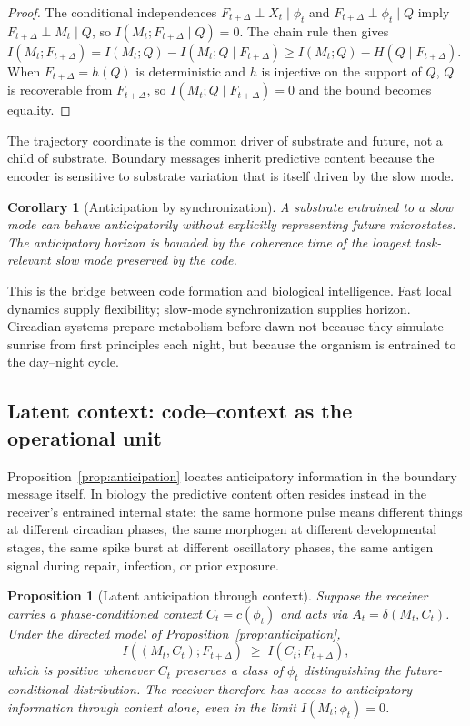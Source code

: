 \documentclass[12pt]{article}
\newtheorem{proposition}{Proposition}
\newtheorem{corollary}{Corollary}
\theoremstyle{definition}
\newcommand{\I}{I}
\begin{document}
\begin{proof}
The conditional independences $F_{t+\Delta}\perp X_t\mid\phi_t$ and $F_{t+\Delta}\perp\phi_t\mid Q$ imply $F_{t+\Delta}\perp M_t\mid Q$, so $\I(M_t;F_{t+\Delta}\mid Q)=0$. The chain rule then gives $\I(M_t;F_{t+\Delta})=\I(M_t;Q)-\I(M_t;Q\mid F_{t+\Delta})\geq\I(M_t;Q)-H(Q\mid F_{t+\Delta})$. When $F_{t+\Delta}=h(Q)$ is deterministic and $h$ is injective on the support of $Q$, $Q$ is recoverable from $F_{t+\Delta}$, so $\I(M_t;Q\mid F_{t+\Delta})=0$ and the bound becomes equality.
\end{proof}

The trajectory coordinate is the common driver of substrate and future, not a child of substrate. Boundary messages inherit predictive content because the encoder is sensitive to substrate variation that is itself driven by the slow mode.

\begin{corollary}[Anticipation by synchronization]
\label{cor:syncanticipation}
A substrate entrained to a slow mode can behave anticipatorily without explicitly representing future microstates. The anticipatory horizon is bounded by the coherence time of the longest task-relevant slow mode preserved by the code.
\end{corollary}

This is the bridge between code formation and biological intelligence. Fast local dynamics supply flexibility; slow-mode synchronization supplies horizon. Circadian systems prepare metabolism before dawn not because they simulate sunrise from first principles each night, but because the organism is entrained to the day--night cycle.

\subsection{Latent context: code--context as the operational unit}
\label{sec:latent}

Proposition~\ref{prop:anticipation} locates anticipatory information in the boundary message itself. In biology the predictive content often resides instead in the receiver's entrained internal state: the same hormone pulse means different things at different circadian phases, the same morphogen at different developmental stages, the same spike burst at different oscillatory phases, the same antigen signal during repair, infection, or prior exposure.

\begin{proposition}[Latent anticipation through context]
\label{prop:latent}
Suppose the receiver carries a phase-conditioned context $C_t=c(\phi_t)$ and acts via $A_t=\delta(M_t,C_t)$. Under the directed model of Proposition~\ref{prop:anticipation},
\[
\I((M_t,C_t);F_{t+\Delta}) \;\geq\; \I(C_t;F_{t+\Delta}),
\]
which is positive whenever $C_t$ preserves a class of $\phi_t$ distinguishing the future-conditional distribution. The receiver therefore has access to anticipatory information through context alone, even in the limit $\I(M_t;\phi_t)=0$.
\end{proposition}
\end{document}
